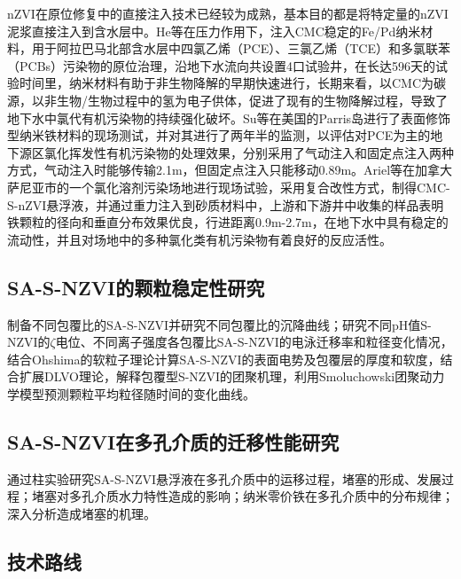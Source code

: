 nZVI在原位修复中的直接注入技术已经较为成熟，基本目的都是将特定量的nZVI泥浆直接注入到含水层中。He等\cite{22}在压力作用下，注入CMC稳定的Fe/Pd纳米材料，用于阿拉巴马北部含水层中四氯乙烯（PCE）、三氯乙烯（TCE）和多氯联苯（PCBs）污染物的原位治理，沿地下水流向共设置4口试验井，在长达596天的试验时间里，纳米材料有助于非生物降解的早期快速进行，长期来看，以CMC为碳源，以非生物/生物过程中的氢为电子供体，促进了现有的生物降解过程，导致了地下水中氯代有机污染物的持续强化破坏。Su等\cite{23}在美国的Parris岛进行了表面修饰型纳米铁材料的现场测试，并对其进行了两年半的监测，以评估对PCE为主的地下源区氯化挥发性有机污染物的处理效果，分别采用了气动注入和固定点注入两种方式，气动注入时能够传输2.1m，但固定点注入只能移动0.89m。Ariel等\cite{24}在加拿大萨尼亚市的一个氯化溶剂污染场地进行现场试验，采用复合改性方式，制得CMC-S-nZVI悬浮液，并通过重力注入到砂质材料中，上游和下游井中收集的样品表明铁颗粒的径向和垂直分布效果优良，行进距离0.9m-2.7m，在地下水中具有稳定的流动性，并且对场地中的多种氯化类有机污染物有着良好的反应活性。


\subsection{SA-S-NZVI的颗粒稳定性研究}

制备不同包覆比的SA-S-NZVI并研究不同包覆比的沉降曲线；研究不同pH值S-NZVI的$\zeta$电位、不同离子强度各包覆比SA-S-NZVI的电泳迁移率和粒径变化情况，结合Ohshima的软粒子理论计算SA-S-NZVI的表面电势及包覆层的厚度和软度，结合扩展DLVO理论，解释包覆型S-NZVI的团聚机理，利用Smoluchowski团聚动力学模型预测颗粒平均粒径随时间的变化曲线。

\subsection{SA-S-NZVI在多孔介质的迁移性能研究}

通过柱实验研究SA-S-NZVI悬浮液在多孔介质中的运移过程，堵塞的形成、发展过程；堵塞对多孔介质水力特性造成的影响；纳米零价铁在多孔介质中的分布规律；深入分析造成堵塞的机理。

\subsection{技术路线}




